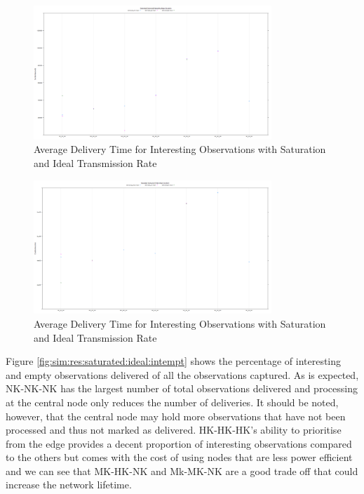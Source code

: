 	\begin{figure}[h]
	\centering
	\includegraphics[width=0.8\textwidth]{Chap7/figures/plots/saturated_ideal/tpvsfp_delivered.png}
	\caption{Average Delivery Time for Interesting Observations with Saturation and Ideal Transmission Rate}
	\label{fig:sim:res:saturated:ideal:tpfp}
	\end{figure}

	\begin{figure}[h]
	\centering
	\includegraphics[width=0.8\textwidth]{Chap7/figures/plots/saturated_ideal/tnvsfn_delivered.png}
	\caption{Average Delivery Time for Interesting Observations with Saturation and Ideal Transmission Rate}
	\label{fig:sim:res:saturated:ideal:tnfn}
	\end{figure}

	Figure \ref{fig:sim:res:saturated:ideal:intempt} shows the percentage of interesting and empty observations delivered of all the observations captured. As is expected, NK-NK-NK has the largest number of total observations delivered and processing at the central node only reduces the number of deliveries. It should be noted, however, that the central node may hold more observations that have not been processed and thus not marked as delivered. HK-HK-HK's ability to prioritise from the edge provides a decent proportion of interesting observations compared to the others but comes with the cost of using nodes that are less power efficient and we can see that MK-HK-NK and Mk-MK-NK are a good trade off that could increase the network lifetime.

